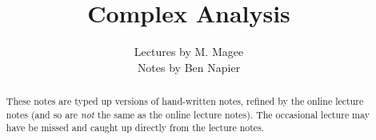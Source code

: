 \documentclass[a4paper]{report}
\title{Complex Analysis}
\author{
    Lectures by M. Magee \\ 
    Notes by Ben Napier
}
\begin{document}
    \maketitle
    \tableofcontents

    \begin{abstract}
        These notes are typed up versions of hand-written notes,
        refined by the online lecture notes 
        (and so are \emph{not} the same as the online lecture notes).
        The occasional lecture may have be missed and caught up directly 
        from the lecture notes.
    \end{abstract}

    
     
    
    
    
    
    
    
    
    
    
    
    
    
    
    
    
    
    
    
    
\end{document}
